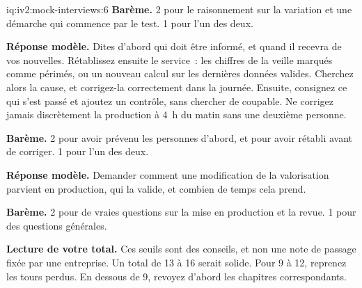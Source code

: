 \begin{solution}{iq:iv2:mock-interviews:6}
\textbf{Barème.} 2 pour le raisonnement sur la variation et une démarche qui commence par le test. 1 pour l'un des deux.

\ivstop
\textbf{Réponse modèle.} Dites d'abord qui doit être informé, et quand il recevra de vos nouvelles. Rétablissez ensuite le service~: les chiffres de la veille marqués comme périmés, ou un nouveau calcul sur les dernières données valides. Cherchez alors la cause, et corrigez-la correctement dans la journée. Ensuite, consignez ce qui s'est passé et ajoutez un contrôle, sans chercher de coupable. Ne corrigez jamais discrètement la production à 4~h du matin sans une deuxième personne.

\textbf{Barème.} 2 pour avoir prévenu les personnes d'abord, et pour avoir rétabli avant de corriger. 1 pour l'un des deux.

\ivstop
\textbf{Réponse modèle.} Demander comment une modification de la valorisation parvient en production, qui la valide, et combien de temps cela prend.

\textbf{Barème.} 2 pour de vraies questions sur la mise en production et la revue. 1 pour des questions générales.

\medskip
\textbf{Lecture de votre total.} Ces seuils sont des conseils, et non une note de passage fixée par une entreprise. Un total de 13 à 16 serait solide. Pour 9 à 12, reprenez les tours perdus. En dessous de 9, revoyez d'abord les chapitres correspondants.

\end{solution}

